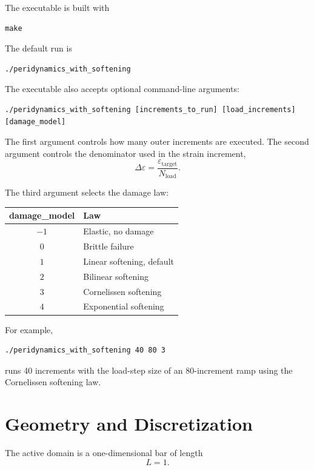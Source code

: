 \documentclass[11pt]{article}
\begin{document}
The executable is built with
\begin{verbatim}
make
\end{verbatim}

The default run is
\begin{verbatim}
./peridynamics_with_softening
\end{verbatim}

The executable also accepts optional command-line arguments:
\begin{verbatim}
./peridynamics_with_softening [increments_to_run] [load_increments] [damage_model]
\end{verbatim}

The first argument controls how many outer increments are executed. The second
argument controls the denominator used in the strain increment,
\begin{equation}
    \Delta\varepsilon =
    \frac{\varepsilon_{\mathrm{target}}}{N_{\mathrm{load}}}.
\end{equation}

The third argument selects the damage law:
\begin{center}
\begin{tabular}{|c|l|}
\hline
\textbf{damage\_model} & \textbf{Law} \\
\hline
\(-1\) & Elastic, no damage \\
\(0\) & Brittle failure \\
\(1\) & Linear softening, default \\
\(2\) & Bilinear softening \\
\(3\) & Cornelissen softening \\
\(4\) & Exponential softening \\
\hline
\end{tabular}
\end{center}

For example,
\begin{verbatim}
./peridynamics_with_softening 40 80 3
\end{verbatim}
runs 40 increments with the load-step size of an 80-increment ramp using the
Cornelissen softening law.

\section{Geometry and Discretization}

The active domain is a one-dimensional bar of length
\begin{equation}
    L = 1 .
\end{equation}
\end{document}
